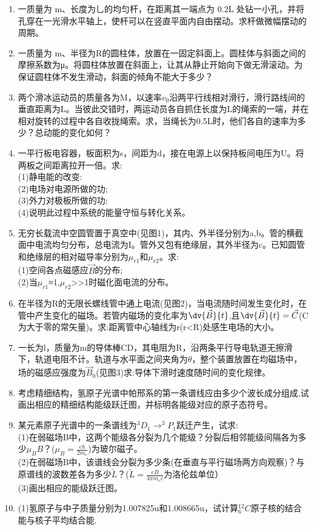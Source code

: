 \begin{enumerate}
\item 一质量为 m、长度为乚的均匀杆，在距离其一端点为 0.2L 处钻一小孔，并将孔穿在一光滑水平轴上，使杆可以在竖直平面内自由摆动。求杆做微幅摆动的周期。
\item 一质量为 m、半径为R的圆柱体，放置在一固定斜面上。圆桂体与斜面之间的摩擦系数为μ。将圆柱体放置在斜面上，让其从静止开始向下做无滑滚动。为保证圆柱体不发生滑动，斜面的倾角不能大于多少？
\item 两个滑冰运动员的质量各为M，以速率$v_0$沿两平行线相对滑行，滑行路线间的垂直距离为L。当彼此交错时，两运动员各自抓住长度为L的绳索的一端，并在相对旋转的过程中各自收拢绳索。求，当绳长为0.5L时，他们各自的速率为多少？总动能的变化如何？
\item 一平行板电容器，板面积为s，间距为d，接在电源上以保持板间电压为U。将两板之间距离拉开一倍。求:\\(1)静电能的改变:\\(2)电场对电源所做的功;\\(3)外力对极板所做的功;\\(4)说明此过程中系统的能量守恒与转化关系。
\item 无穷长载流中空圆管置于真空中(见图1)，其内、外半径分别为a,b。管的横截面中电流均匀分布，总电流为I。管外又包有绝缘层，其外半径为c。已知圆管和绝缘层的相对磁导率分别为$\mu_{r1}$和$\mu_{r2}$。求:\\
(1)空间各点磁感应$\vec B$的分布;\\
(2)当$\mu_{r1}$≈1,$\mu_{r2}$>>1时磁化面电流的分布。
\item 在半径为R的无限长螺线管中通上电流(见图2)，当电流随时间发生变化时，在管中产生变化的磁场。若管内磁场的变化率为$\displaystyle \dv{\vec B}{t}$,且$\displaystyle \dv{\vec B}{t}=\vec C$(\vec C为大于零的常矢量)。求:距离管中心轴线为r(r<R)处感生电场的大小。
\item 一长为l，质量为m的导体棒CD，其电阻为R，沿两条平行导电轨道无擦滑下，轨道电阻不计。轨道与水平面之间夹角为$\theta $，整个装置放置在均磁场中，场的磁感应强度为$\vec B_0$(见图3)求:导体下滑时速度随时间的变化规律。
\item 考虑精细结构，氢原子光谱中帕邢系的第一条谱线应由多少个波长成分组成,试画出相应的精细结构能级跃迁图，并标明各能级对应的原子态符号。
\item 某元素原子光谱中的一条谱线为$^3D_1 \to ^3P_1$跃迁产生，试求:\\
(1)在弱磁场B中，这两个能级各分裂为几个能级？分裂后相邻能级间隔各为多少$\mu_B B$？($\mu_B=\frac{eh}{2m_e}$)为玻尔磁子。\\
(2)在弱磁场B中，该谱线会分裂为多少条(在垂直与平行磁场两方向观察)？与原谱线的波数差各为多少$\widetilde L$？($\widetilde L=\frac{eB}{4\pi m_e c}$为洛伦兹单位）\\
(3)画出相应的能级跃迁图。
\item (1)氢原子与中子质量分别为1.007825u和1.008665u，试计算$^12_6C$原子核的结合能与核子平均结合能.

\end{enumerate}

